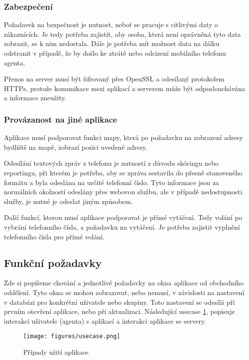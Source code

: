 \documentclass[11pt,twoside,a4paper]{book}
\begin{document}
\subsubsection{Zabezpečení}
Požadavek na bezpečnost je nutnost, neboť se pracuje s citlivými daty o zákaznících. Je tedy potřeba zajistit, aby osoba, která není oprávněná tyto data zobrazit, se k nim nedostala. Dále je potřeba mít možnost data na dálku odstranit v případě, že by došlo ke ztrátě nebo odcizení mobilního telefonu agenta.

Přenos na server musí být šifrovaný přes OpenSSL a odesílaný protokolem HTTPs, protože komunikace mezi aplikací a serverem může být odposlouchávána a informace zneužity. 

\subsubsection{Provázanost na jiné aplikace}
Aplikace musí podporovat funkci mapy, která po požadavku na zobrazení adresy bydlištš na mapě, zobrazí pozici uvedené adresy. 

Odesílání textových zpráv z telefonu je nutností z důvodu skóringu nebo reportingu, při kterém je potřeba, aby se zpráva sestavila do přesně stanoveného formátu a byla odeslána na určité telefonní číslo. Tyto informace jsou za normálních okolností odeslány přes webovou službu, ale v případě nedostupnosti služby, je nutné je odeslat jiným způsobem.

Další funkcí, kterou musí aplikace podporovat je přímé vytáčení. Tedy volání po vybrání telefonního čísla, a požadavku na vytáčení. Je potřeba zajistit vyplnění telefonního čísla pro přímé volání. 

\subsection{Funkční požadavky}
Zde si popíšeme chování a jednotlivé požadavky na okna aplikace od obchodního oddělení. Tyto okna se mohou zobrazovat, nebo nemusí, v závislosti na nastavení v databázi pro konkrétní uživatele nebo skupiny. Toto nastavení se odesílá při prvním otevření aplikace, nebo při aktualizaci. Následující usecase \ref{fig:usecase}, popisuje interakci uživatele (agenta) s aplikací a  interakci aplikace se servery.

\begin{figure}[ht]
	\begin{center}
	\texttt{[image: figures/usecase.png]}
	\caption{Případy užití aplikace}
	\label{fig:usecase}
	\end{center}
	\end{figure}
\end{document}

